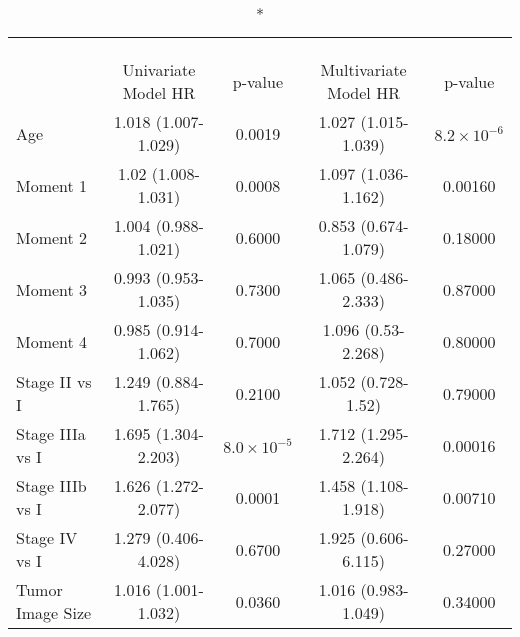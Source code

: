 \captionsetup[table]{labelformat=empty,skip=1pt}
\begin{longtable}{lcccc}
\caption*{
\large Cox Proportional Hazard Model\\ 
\small \\ 
} \\ 
\toprule
 & Univariate Model HR & p-value & Multivariate Model HR & p-value \\ 
\midrule
Age & 1.018 (1.007-1.029) & 0.0019 & 1.027 (1.015-1.039) & $8.2 \times 10^{-6}$ \\ 
Moment 1 & 1.02 (1.008-1.031) & 0.0008 & 1.097 (1.036-1.162) & 0.00160 \\ 
Moment 2 & 1.004 (0.988-1.021) & 0.6000 & 0.853 (0.674-1.079) & 0.18000 \\ 
Moment 3 & 0.993 (0.953-1.035) & 0.7300 & 1.065 (0.486-2.333) & 0.87000 \\ 
Moment 4 & 0.985 (0.914-1.062) & 0.7000 & 1.096 (0.53-2.268) & 0.80000 \\ 
Stage II vs I & 1.249 (0.884-1.765) & 0.2100 & 1.052 (0.728-1.52) & 0.79000 \\ 
Stage IIIa vs I & 1.695 (1.304-2.203) & $8.0 \times 10^{-5}$ & 1.712 (1.295-2.264) & 0.00016 \\ 
Stage IIIb vs I & 1.626 (1.272-2.077) & 0.0001 & 1.458 (1.108-1.918) & 0.00710 \\ 
Stage IV vs I & 1.279 (0.406-4.028) & 0.6700 & 1.925 (0.606-6.115) & 0.27000 \\ 
Tumor Image Size & 1.016 (1.001-1.032) & 0.0360 & 1.016 (0.983-1.049) & 0.34000 \\ 
\bottomrule
\end{longtable}

